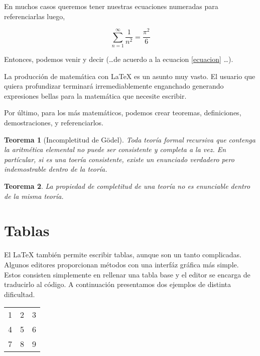 \documentclass[11pt,a4paper]{article} %
\newtheorem{godel}{Teorema}
\begin{document}
En muchos casos queremos tener nuestras ecuaciones numeradas para referenciarlas luego,

\begin{equation} \label{ecuacion}
\sum _{n=1}^{\infty} \frac{1}{n^{2}} = \frac{\pi^{2}}{6}
\end{equation}

Entonces, podemos venir y decir (\ldots de acuerdo a la ecuacion \ref{ecuacion} \ldots).

La producci\'on de matem\'atica con \LaTeX{} es un asunto muy vasto. El usuario que quiera profundizar terminar\'a irremediablemente enganchado generando expresiones bellas para la matem\'atica que necesite escribir. 

Por \'ultimo, para los m\'as matem\'aticos, podemos crear teoremas, definiciones, demostraciones, y referenciarlos.

\begin{godel}[Incompletitud de G\"odel]
Toda teor\'ia formal recursiva que contenga la aritm\'etica elemental no puede ser consistente y completa a la vez. En part\'icular, si es una toer\'ia consistente, existe un enunciado verdadero pero indemostrable dentro de la teor\'ia.
\end{godel}

\begin{godel}
La propiedad de completitud de una teor\'ia no es enunciable dentro de la misma teor\'ia.
\end{godel}

\clearpage

\section{Tablas}

El \LaTeX{} tambi\'en permite escribir tablas, aunque son un tanto complicadas. Algunos editores proporcionan m\'etodos con una interf\'az gr\'afica m\'as simple. Estos consisten simplemente en rellenar una tabla base y el editor se encarga de traducirlo al c\'odigo. A continuaci\'on presentamos dos ejemplos de distinta dificultad.
\vspace{5mm}

\begin{center} %
\begin{tabular}{ l | c || r } %
  \hline  %
  1 & 2 & 3 \\ %
  4 & 5 & 6 \\
  7 & 8 & 9 \\
  \hline  
\end{tabular}
\end{center}
\end{document}

